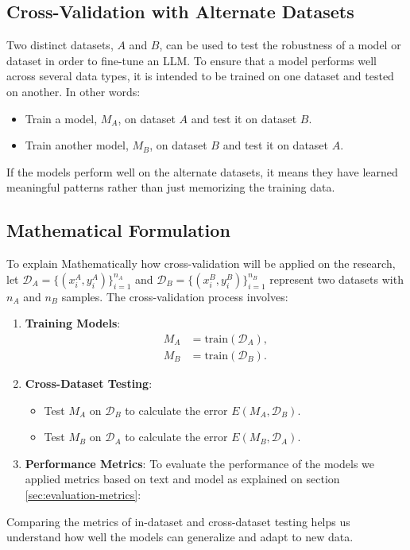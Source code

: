 \subsection{Cross-Validation with Alternate Datasets}

Two distinct datasets, $A$ and $B$, can be used to test the robustness of a model or dataset in order to fine-tune an LLM. To ensure that a model performs well across several data types, it is intended to be trained on one dataset and tested on another. In other words:

\begin{itemize}
    \item Train a model, $M_A$, on dataset $A$ and test it on dataset $B$.
    \item Train another model, $M_B$, on dataset $B$ and test it on dataset $A$.
\end{itemize}

If the models perform well on the alternate datasets, it means they have learned meaningful patterns rather than just memorizing the training data.

\subsection{Mathematical Formulation}

To explain Mathematically how cross-validation will be applied on the research, let $\mathcal{D}_A = \{(x_i^A, y_i^A)\}_{i=1}^{n_A}$ and $\mathcal{D}_B = \{(x_i^B, y_i^B)\}_{i=1}^{n_B}$ represent two datasets with $n_A$ and $n_B$ samples. The cross-validation process involves:

\begin{enumerate}
    \item \textbf{Training Models}: 
   \begin{align}
       M_A &= \text{train}(\mathcal{D}_A), \\
       M_B &= \text{train}(\mathcal{D}_B).
   \end{align}

    \item \textbf{Cross-Dataset Testing}: 
   \begin{itemize}
    \item Test $M_A$ on $\mathcal{D}_B$ to calculate the error $E(M_A, \mathcal{D}_B)$.
    \item Test $M_B$ on $\mathcal{D}_A$ to calculate the error $E(M_B, \mathcal{D}_A)$.
   \end{itemize} 

    \item \textbf{Performance Metrics}: To evaluate the performance of the models we applied metrics based on text and  model as explained on section \ref{sec:evaluation-metrics}:
\end{enumerate}
Comparing the metrics of in-dataset and cross-dataset testing helps us understand how well the models can generalize and adapt to new data.

